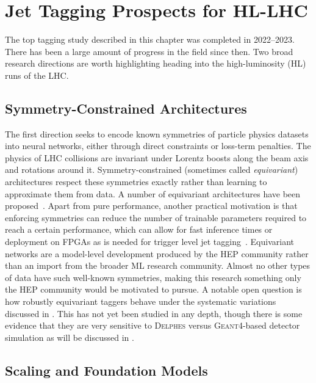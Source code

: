 \section{Jet Tagging Prospects for HL-LHC}
\label{sec:tagging-future}

The top tagging study described in this chapter was completed in 2022--2023.
There has been a large amount of progress in the field since then.
Two broad research directions are worth highlighting heading into the high-luminosity (HL) runs of the LHC.

\subsection{Symmetry-Constrained Architectures}

The first direction seeks to encode known symmetries of particle physics datasets into neural networks, either through direct constraints or loss-term penalties.
The physics of LHC collisions are invariant under Lorentz boosts along the beam axis and rotations around it.
Symmetry-constrained (sometimes called \textit{equivariant}) architectures respect these symmetries exactly rather than learning to approximate them from data.
A number of equivariant architectures have been proposed~\cite{Gong:2022lye, Bogatskiy:2022czk, Brehmer:2024yqw}.
Apart from pure performance, another practical motivation is that enforcing symmetries can reduce the number of trainable parameters required to reach a certain performance, which can allow for fast inference times or deployment on FPGAs as is needed for trigger level jet tagging~\cite{Petitjean:2025zjf}.
Equivariant networks are a model-level development produced by the HEP community rather than an import from the broader ML research community.
Almost no other types of data have such well-known symmetries, making this research something only the HEP community would be motivated to pursue.
A notable open question is how robustly equivariant taggers behave under the systematic variations discussed in .
This has not yet been studied in any depth, though there is some evidence that they are very sensitive to \textsc{Delphes} versus \textsc{Geant4}-based detector simulation as will be discussed in .

\subsection{Scaling and Foundation Models}

